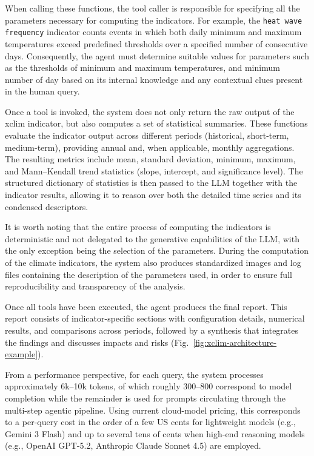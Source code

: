 When calling these functions, the tool caller is responsible for specifying all the parameters necessary for computing the indicators. For example, the \texttt{heat wave frequency} indicator counts events in which both daily minimum and maximum  temperatures exceed predefined thresholds over a specified number of consecutive days. Consequently, the agent must determine suitable values for parameters such as the thresholds of minimum and maximum temperatures, and minimum number of day based on its internal knowledge and any contextual clues present in the human query.

Once a tool is invoked, the system does not only return the raw output of the xclim indicator, but also computes a set of statistical summaries. 
These functions evaluate the indicator output across different periods (historical, short-term, medium-term), providing annual and, when applicable, monthly aggregations. 
The resulting metrics include mean, standard deviation, minimum, maximum, and Mann--Kendall trend  statistics \citep{gilbert_statistical_1987} (slope, intercept, and significance level). 
The structured dictionary of statistics is then passed to the LLM together with the indicator results, allowing it to reason over both the detailed time series and its condensed descriptors.

It is worth noting that the entire process of computing the indicators is deterministic and not delegated to the generative capabilities of the LLM, with the only exception being the selection of the parameters. During the computation of the climate indicators, the system also produces standardized images and log files containing the description of the parameters used, in order to ensure full reproducibility and transparency of the analysis.

Once all tools have been executed, the agent produces the final report. This report consists of indicator-specific sections with configuration details, numerical results, and comparisons across periods, followed by a synthesis that integrates the findings and discusses impacts and risks (Fig.~\ref{fig:xclim-architecture-example}).     

From a performance perspective, for each query, the system processes approximately 6k–10k tokens, of which roughly 300–800 correspond to model completion while the remainder is used for prompts circulating through the multi-step agentic pipeline. Using current cloud-model pricing, this corresponds to a per-query cost in the order of a few US cents for lightweight models (e.g., Gemini 3 Flash) and up to several tens of cents when high-end reasoning models (e.g., OpenAI GPT-5.2, Anthropic Claude Sonnet 4.5) are employed.

